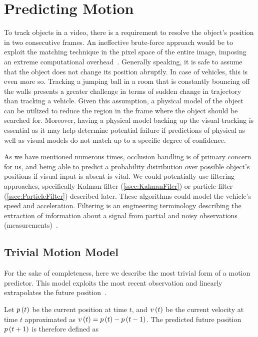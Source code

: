 \section{Predicting Motion}
\label{sec:PredictingMotion}

To track objects in a video, there is a requirement to resolve the object's position in two consecutive frames. An ineffective brute-force approach would be to exploit the matching technique in the pixel space of the entire image, imposing an extreme computational overhead~\cite{Jalal2012}. Generally speaking, it is safe to assume that the object does not change its position abruptly. In case of vehicles, this is even more so. Tracking a jumping ball in a room that is constantly bouncing off the walls presents a greater challenge in terms of sudden change in trajectory than tracking a vehicle. Given this assumption, a physical model of the object can be utilized to reduce the region in the frame where the object should be searched for. Moreover, having a physical model backing up the visual tracking is essential as it may help determine potential failure if predictions of physical as well as visual models do not match up to a specific degree of confidence.

As we have mentioned numerous times, occlusion handling is of primary concern for us, and being able to predict a probability distribution over possible object's positions if visual input is absent is vital. We could potentially use filtering approaches, specifically Kalman filter (\cref{ssec:KalmanFiler}) or particle filter (\cref{ssec:ParticleFilter}) described later. These algorithms could model the vehicle's speed and acceleration. Filtering is an engineering terminology describing the extraction of information about a signal from partial and noisy observations (measurements)~\cite{Kunsch2013}.

\subsection{Trivial Motion Model}
\label{ssec:TrivialMotionModel}

For the sake of completeness, here we describe the most trivial form of a motion predictor. This model exploits the most recent observation and linearly extrapolates the future position~\cite{broida1986estimation}.

Let ${p} \left( t \right)$ be the current position at time $t$, and ${v} \left( t \right)$ be the current velocity at time $t$ approximated as ${v} \left( t \right) = {p} \left( t \right) - {p} \left( t - 1 \right)$. The predicted future position ${p} \left( t + 1 \right)$ is therefore defined as

